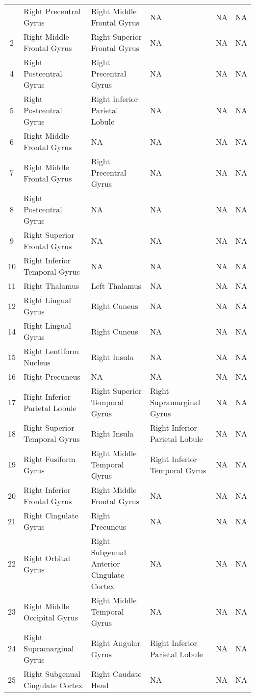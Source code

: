 \documentclass[10pt,letterpaper]{article}\usepackage[]{graphicx}\usepackage[]{color}
\begin{document}
\begin{center}
\begin{longtable}[c]{cp{1.1in}p{1.1in}p{1.1in}p{1.1in}p{1.1in}}
		\bottomrule
		\endlastfoot
		1 & Right Precentral Gyrus & Right Middle Frontal Gyrus	& NA & NA & NA \\
		2 & Right Middle Frontal Gyrus & Right Superior Frontal Gyrus & NA & NA & NA \\
		4 & Right Postcentral Gyrus	& Right Precentral Gyrus & NA & NA & NA \\
		5 & Right Postcentral Gyrus	& Right Inferior Parietal Lobule & NA & NA & NA \\
		6 & Right Middle Frontal Gyrus & NA & NA & NA & NA \\
		7 & Right Middle Frontal Gyrus & Right Precentral Gyrus & NA & NA & NA \\
		8 & Right Postcentral Gyrus	& NA & NA & NA & NA \\
		9 & Right Superior Frontal Gyrus & NA & NA & NA & NA \\
		10 & Right Inferior Temporal Gyrus & NA	& NA & NA & NA \\
		11 & Right Thalamus	& Left Thalamus & NA & NA	& NA \\
		12 & Right Lingual Gyrus & Right Cuneus	& NA & NA & NA \\
		14 & Right Lingual Gyrus & Right Cuneus	& NA & NA & NA \\
		15 & Right Lentiform Nucleus & Right Insula & NA & NA & NA \\
		16 & Right Precuneus & NA & NA & NA	& NA \\
		17 & Right Inferior Parietal Lobule & Right Superior Temporal Gyrus & Right Supramarginal Gyrus	& NA & NA \\
		18 & Right Superior Temporal Gyrus & Right Insula &	Right Inferior Parietal Lobule & NA	& NA \\
		19 & Right Fusiform Gyrus & Right Middle Temporal Gyrus & Right Inferior Temporal Gyrus & NA & NA \\
		20 & Right Inferior Frontal Gyrus & Right Middle Frontal Gyrus & NA	& NA & NA \\
		21 & Right Cingulate Gyrus & Right Precuneus & NA & NA & NA \\
		22 & Right Orbital Gyrus & Right Subgenual Anterior Cingulate Cortex & NA & NA & NA \\
		23 & Right Middle Occipital Gyrus & Right Middle Temporal Gyrus & NA & NA & NA \\
		24 & Right Supramarginal Gyrus & Right Angular Gyrus & Right Inferior Parietal Lobule & NA & NA \\
		25 & Right Subgenual Cingulate Cortex & Right Caudate Head & NA & NA & NA \\

\end{longtable}
\end{center}
\end{document}
